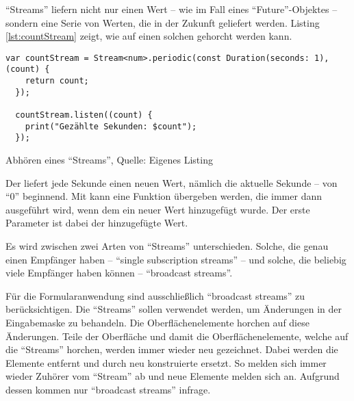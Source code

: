 \enquote{Streams} liefern nicht nur einen Wert -- wie im Fall eines \enquote{Future}-Objektes -- sondern eine Serie von Werten, die in der Zukunft geliefert werden.
Listing \ref{lst:countStream} zeigt, wie auf einen solchen  gehorcht werden kann.
\ifIncludeFigures
  \begin{listing}[ht]
    \begin{verbatim}
var countStream = Stream<num>.periodic(const Duration(seconds: 1), (count) {
    return count;
  });

  countStream.listen((count) {
    print("Gezählte Sekunden: $count");
  });
\end{verbatim}
    \caption[Abhören eines \enquote{Streams}]{Abhören eines \enquote{Streams}, Quelle: Eigenes Listing}
    \label{lst:countStream}
  \end{listing}
\fi

Der  liefert jede Sekunde einen neuen Wert, nämlich die aktuelle Sekunde -- von \enquote{0} beginnend.
Mit  kann eine Funktion übergeben werden, die immer dann ausgeführt wird, wenn dem  ein neuer Wert hinzugefügt wurde.
Der erste Parameter  ist dabei der hinzugefügte Wert.



Es wird zwischen zwei Arten von \enquote{Streams} unterschieden.
Solche, die genau einen Empfänger haben -- \enquote{single subscription streams} -- und solche, die beliebig viele Empfänger haben können -- \enquote{broadcast streams}.

Für die Formularanwendung sind ausschließlich \enquote{broadcast streams} zu berücksichtigen.
Die \enquote{Streams} sollen verwendet werden, um Änderungen in der Eingabemaske zu behandeln.
Die  Oberflächenelemente horchen auf diese Änderungen.
Teile der Oberfläche und damit die Oberflächenelemente, welche auf die \enquote{Streams} horchen, werden immer wieder neu gezeichnet.
Dabei werden die Elemente entfernt und durch neu konstruierte ersetzt.
So melden sich immer wieder Zuhörer vom \enquote{Stream} ab und neue Elemente melden sich an.
Aufgrund dessen kommen nur \enquote{broadcast streams} infrage.


